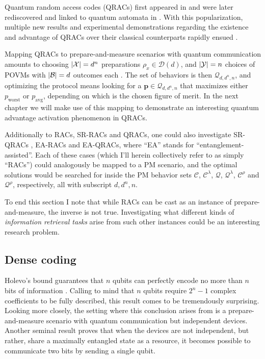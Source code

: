             Quantum random access codes (QRACs) first appeared in \cite{wiesner1983conjugate} and were later rediscovered and linked to quantum automata in \cite{ambainis_qracsoriginal_1999}. With this popularization, multiple new results and experimental demonstrations regarding the existence and advantage of QRACs over their classical counterparts rapidly ensued \cite{nayak1999optimal,ambainis2002dense,hayashi_41qracs_2006,ambainis_srqracs_2009,spekkens2009preparation,pawlowski_pamqkd_2011}.

            Mapping QRACs to prepare-and-measure scenarios with quantum communication amounts to choosing $\abs{\mathcal{X}} = d^n$ preparations $\rho_{x} \in \mathcal{D}(d)$, and $\abs{\mathcal{Y}} = n$  choices of POVMs with $\abs{\mathcal{B}} = d$ outcomes each \cite{de_vicente_bound_2019}. The set of behaviors is then $\mathcal{Q}_{d,d^n,n}$, and optimizing the protocol means looking for a $\mathbf{p} \in \mathcal{Q}_{d,d^n,n}$ that maximizes either $p_{\text{worst}}$ or $p_{\text{avg}}$, depending on which is the chosen figure of merit. In the next chapter we will make use of this mapping to demonstrate an interesting quantum advantage activation phenomenon in QRACs.

            Additionally to RACs, SR-RACs and QRACs, one could also investigate SR-QRACs \cite{ambainis_srqracs_2009}, EA-RACs \cite{pawlowski_earacs_2010} and EA-QRACs, where ``EA'' stands for ``entanglement-assisted''. Each of these cases (which I'll herein collectively refer to as simply ``RACs'') could analogously be mapped to a PM scenario, and the optimal solutions would be searched for inside the PM behavior sets $\mathcal{C}$, $\mathcal{C}^\lambda$, $\mathcal{Q}$, $\mathcal{Q}^\lambda$, $\mathcal{C}^\rho$ and $\mathcal{Q}^\rho$, respectively, all with subscript $d,d^n,n$.

            To end this section I note that while RACs can be cast as an instance of prepare-and-measure, the inverse is not true. Investigating what different kinds of \emph{information retrieval tasks} \cite{emeriau_torpedo_2020} arise from such other instances could be an interesting research problem.

        \subsection{Dense coding}
        \label{sec:dense-coding}

            Holevo's bound guarantees that $n$ qubits can perfectly encode no more than $n$ bits of information \cite{holevo-bound-1973}. Calling to mind that $n$ qubits require $2^n - 1$ complex coefficients to be fully described, this result comes to be tremendously surprising. Looking more closely, the setting where this conclusion arises from is a prepare-and-measure scenario with quantum communication but independent devices. Another seminal result proves that when the devices are not independent, but rather, share a maximally entangled state as a resource, it becomes possible to communicate two bits by sending a single qubit.

